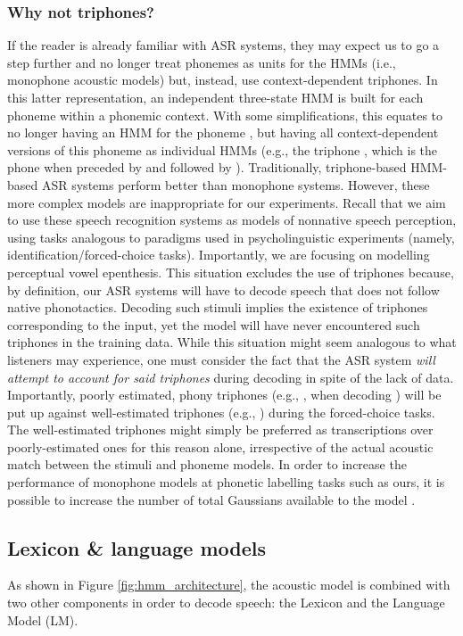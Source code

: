\subsubsection{Why not triphones?}
If the reader is already familiar with ASR systems, they may expect us to go a step further and no longer treat phonemes as units for the HMMs (i.e., monophone acoustic models) but, instead, use context-dependent triphones. In this latter representation, an independent three-state HMM is built for each phoneme within a phonemic context. With some simplifications, this equates to no longer having an HMM for the phoneme , but having all context-dependent versions of this phoneme as individual HMMs (e.g., the triphone , which is the phone  when preceded by  and followed by ).
Traditionally, triphone-based HMM-based ASR systems perform better than monophone systems. However, these more complex models are inappropriate for our experiments. Recall that we aim to use these speech recognition systems as models of nonnative speech perception, using tasks analogous to paradigms used in psycholinguistic experiments (namely, identification/forced-choice tasks). Importantly, we are focusing on modelling perceptual vowel epenthesis. This situation excludes the use of triphones because, by definition, our ASR systems will have to decode speech that does not follow native phonotactics. Decoding such stimuli implies the existence of triphones corresponding to the input, yet the model will have never encountered such triphones in the training data. While this situation might seem analogous to what listeners may experience, one must consider the fact that the ASR system \textit{will attempt to account for said triphones} during decoding in spite of the lack of data. Importantly, poorly estimated, phony triphones (e.g., , when decoding ) will be put up against well-estimated triphones (e.g., ) during the forced-choice tasks. The well-estimated triphones might simply be preferred as transcriptions over poorly-estimated ones for this reason alone, irrespective of the actual acoustic match between the stimuli and phoneme models.
In order to increase the performance of monophone models at phonetic labelling tasks such as ours, it is possible to increase the number of total Gaussians available to the model \cite{saraclar2001}. 

\subsection{Lexicon \& language models} \label{hmm_lm}
As shown in Figure \ref{fig:hmm_architecture}, the acoustic model is combined with two other components in order to decode speech: the Lexicon and the Language Model (LM).

